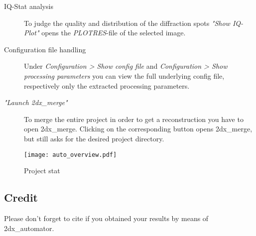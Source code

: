 \begin{description}
	\item [IQ-Stat analysis] To judge the quality and distribution of the diffraction spots \textit{"Show IQ-Plot"} opens the \textit{PLOTRES}-file of the selected image.
	
	\item [Configuration file handling] Under \textit{Configuration > Show config file} and  \textit{Configuration > Show processing parameters} you can view the full underlying config file, respectively only the extracted processing parameters.

	\item [\textit{"Launch 2dx\_merge"}] To merge the entire project in order to get a reconstruction you have to open 2dx\_merge. Clicking on the corresponding button opens 2dx\_merge, but still asks for the desired project directory. 
\end{description}


\begin{figure}
	\centering
	\texttt{[image: auto\_overview.pdf]}
	\caption{Project stat}
	\label{fig:auto_stat}
\end{figure}

\subsection{Credit}
Please don't forget to cite \cite{scherer20142dx_automator} if you obtained your results by means of 2dx\_automator.